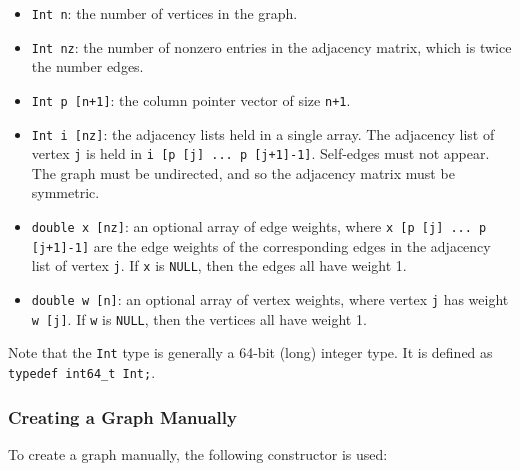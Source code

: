 \documentclass[letter]{article}
\begin{document}
    \begin{itemize}
    \item \texttt{Int n}: the number of vertices in the graph.
    \item \texttt{Int nz}: the number of nonzero entries in the adjacency matrix,
        which is twice the number edges.
    \item \texttt{Int p [n+1]}: the column pointer vector of size \texttt{n+1}.
    \item \texttt{Int i [nz]}: the adjacency lists held in a single array.  The adjacency
        list of vertex \texttt{j} is held in \texttt{i [p [j] ... p [j+1]-1]}.
        Self-edges must not appear.
        The graph must be undirected, and so the adjacency matrix must be symmetric.
    \item \texttt{double x [nz]}: an optional array of edge weights, where
        \texttt{x [p [j] ... p [j+1]-1]} are the edge weights of the corresponding
        edges in the adjacency list of vertex \texttt{j}.
        If \texttt{x} is \texttt{NULL}, then the edges all have weight 1.
    \item \texttt{double w [n]}: an optional array of vertex weights,
        where vertex \texttt{j} has weight \texttt{w [j]}.
        If \texttt{w} is \texttt{NULL}, then the vertices all have weight 1.
    \end{itemize}
    
Note that the \texttt{Int} type is generally a 64-bit (long) integer type. It
is defined as \verb'typedef int64_t Int;'.

\subsubsection{Creating a Graph Manually}

To create a graph manually, the following constructor is used: \\
\end{document}

